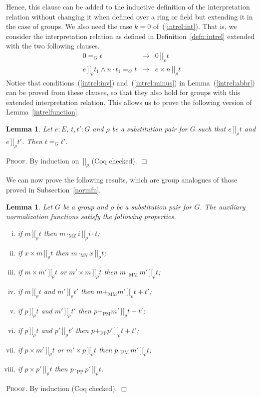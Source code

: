\documentclass{article}
\newtheorem{lemma}[definition]{Lemma}
\newenvironment{proof}{\smallskip\textsc{Proof.}}{\hspace*{\fill}$\Box$}
\newcommand{\intII}{\,]\![}
\newcommand{\intrel}{\mathbin{\intII_{\rho}}}
\newcommand{\Z}{{\mathbb Z}}
\newcommand{\V}{{\mathbb V}}
\newcommand{\iter}[2]{\ensuremath{{#1}\cdot{#2}}}
\newcommand{\multMZ}{\ensuremath{\cdot_{\mathrm M\Z}}}
\newcommand{\multMV}{\ensuremath{\cdot_{\mathrm M\V}}}
\newcommand{\multMM}{\ensuremath{\cdot_{\mathrm{MM}}}}
\newcommand{\plusMM}{\ensuremath{+_{\mathrm{MM}}}}
\newcommand{\plusPM}{\ensuremath{+_{\mathrm{PM}}}}
\newcommand{\plusPP}{\ensuremath{+_{\mathrm{PP}}}}
\newcommand{\multPM}{\ensuremath{\cdot_{\mathrm{PM}}}}
\newcommand{\multPP}{\ensuremath{\cdot_{\mathrm{PP}}}}
\begin{document}
\bigskip

Hence, this clause can be added to the inductive definition of
the interpretation relation without changing it when defined over a
ring or field but extending it in the case of groups.
We also need the case $k=0$ of~(\ref{intrel:int}).  That is, we
consider the interpretation relation as defined in
Definition~\ref{defn:intrel} extended with the two following clauses.
\begin{eqnarray}
\label{intrel:zero}
0=_G t & \rightarrow & 0\intrel t\\
\label{intrel:iter}
e\intrel t_1 \wedge \iter n{t_1}=_G t & \rightarrow & e\times n\intrel t
\end{eqnarray}
Notice that conditions~(\ref{intrel:inv}) and~(\ref{intrel:minus}) in
Lemma~(\ref{intrel:abbr}) can be proved from these clauses, so that
they also hold for groups with this extended interpretation relation.
This allows us to prove the following version of Lemma~\ref{intrelfunction}.

\begin{lemma}\label{intrelfunction:group} Let $e:E$, $t,t':G$ and $\rho$ be
a substitution pair for $G$ such that $e\intrel t$ and $e\intrel t'$.
Then $t=_G t'$.
\end{lemma}
\begin{proof} By induction on $\intrel$ (Coq checked).
\end{proof}

\bigskip

We can now prove the following results, which are group analogues of those
proved in Subsection~\ref{normfn}.

\begin{lemma}\label{groupprops}
Let $G$ be a group and $\rho$ be a substitution pair for $G$.
The auxiliary normalization functions satisfy the following properties.
\begin{enumerate}[(i)]
\item if $m\intrel t$ then $m\multMZ i\intrel\iter it$;
\item if $x\times m\intrel t$ then $m\multMV x\intrel t$;
\item if $m\times m'\intrel t$ or $m'\times m\intrel t$ then
$m\multMM m'\intrel t$;
\item if $m\intrel t$ and $m'\intrel t'$ then $m\plusMM m'\intrel t+t'$;
\item if $p\intrel t$ and $m'\intrel t'$ then $p\plusPM m'\intrel t+t'$;
\item if $p\intrel t$ and $p'\intrel t'$ then $p\plusPP p'\intrel t+t'$;
\item if $p\times m'\intrel t$ or $m'\times p\intrel t$ then
$p\multPM m'\intrel t$;
\item if $p\times p'\intrel t$ then $p\multPP p'\intrel t$.
\end{enumerate}
\end{lemma}
\begin{proof} By induction (Coq checked).
\end{proof}
\end{document}
